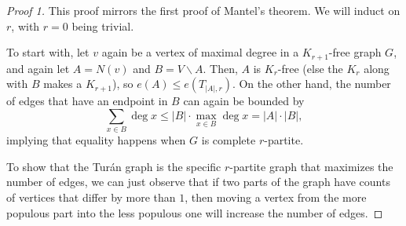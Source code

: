 \documentclass[10pt]{scrartcl}
\providecommand{\setdiff}{\smallsetminus}
\begin{document}
\begin{proof}[Proof 1]
	This proof mirrors the first proof of Mantel's theorem.
	We will induct on $r$, with $r = 0$ being trivial.
	
	To start with, let $v$ again be a vertex of maximal degree
	in a $K_{r+1}$-free graph $G$, and again let $A = N(v)$ and
	$B = V\setdiff A$. Then, $A$ is $K_r$-free (else the $K_r$ along with
	$B$ makes a $K_{r+1}$), so $e(A)\le e(T_{|A|, r})$.
	On the other hand, the number of edges that have an endpoint in $B$
	can again be bounded by
	\[\sum_{x\in B}\deg x\le |B|\cdot\max_{x\in B}\deg x = |A|\cdot|B|,\]
	implying that equality happens when $G$ is complete $r$-partite.
	
	To show that the Tur\'an graph is the specific $r$-partite graph
	that maximizes the number of edges, we can just observe that
	if two parts of the graph have counts of vertices that differ by
	more than $1$, then moving a vertex from the more populous part
	into the less populous one will increase the number of edges.
\end{proof}




















	
\end{document}
